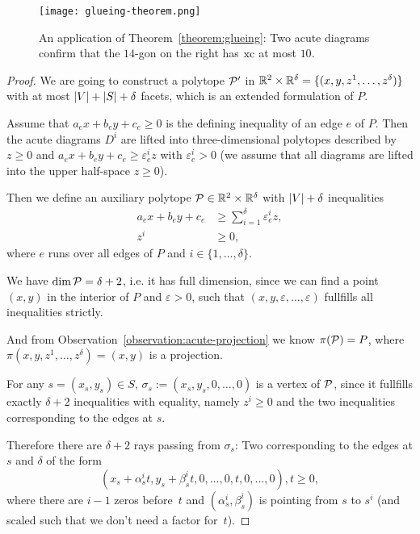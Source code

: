 \begin{figure}[h]
  \centering
  \texttt{[image: glueing-theorem.png]}
  \caption{An application of Theorem~\ref{theorem:glueing}: Two acute diagrams confirm that the $14$-gon on the right has $\xc$ at most $10$. \cite[Figure 3]{shitov2020sublinear}}
  \label{fig:glueing-theorem}
\end{figure}


\begin{proof}
  We are going to construct a polytope $\P'$ in $\R^2 \times \R^{\delta} = \{(x,y,z^1,\dots,z^{\delta})\}$ with at most $\abs{V}+\abs{S}+\delta$ facets, which is an extended formulation of $P$.

  Assume that $a_e x + b_e y + c_e \geq 0$ is the defining inequality of an edge $e$ of $P$. Then the acute diagrams $D^i$ are lifted into three-dimensional polytopes described by $z \geq 0$ and $a_e x + b_e y + c_e \geq \varepsilon_e^i z$ with $\varepsilon_e^i > 0$ (we assume that all diagrams are lifted into the upper half-space $z \geq 0$).

  Then we define an auxiliary polytope $\P \in \R^2 \times \R^{\delta}$ with $\abs{V}+\delta$ inequalities 
  \begin{align*}
    a_e x + b_e y + c_e &\geq \sum_{i=1}^{\delta} \varepsilon_e^i z,\\
    z^i &\geq 0,
  \end{align*}
  where $e$ runs over all edges of $P$ and $i \in \{1,\dots,\delta\}$.

  We have $\dim \P = \delta + 2$, i.e. it has full dimension, since we can find a point $(x,y)$ in the interior of $P$ and $\varepsilon > 0$, such that $(x,y,\varepsilon,\dots,\varepsilon)$ fullfills all inequalities strictly.

  And from Observation~\ref{observation:acute-projection} we know $\pi(\P)=P$, where $\pi(x,y,z^1,\dots,z^{\delta}) = (x,y)$ is a projection.

  For any $s = (x_s, y_s) \in S$, $\sigma_s := (x_s,y_s,0,\dots,0)$ is a vertex of $\P$, since it fullfills exactly $\delta + 2$ inequalities with equality, namely $z^i \geq 0$ and the two inequalities corresponding to the edges at $s$.

  Therefore there are $\delta + 2$ rays passing from $\sigma_s$: Two corresponding to the edges at $s$ and $\delta$ of the form
  \begin{equation}\label{eq:ray}
    (x_s + \alpha_s^i t,y_s + \beta_s^i t,0,\dots,0,t,0,\dots,0), t \geq 0,
  \end{equation}
  where there are $i-1$ zeros before~$t$ and $(\alpha_s^i, \beta_s^i)$ is pointing from $s$ to $s^i$ (and scaled such that we don't need a factor for~$t$).


\end{proof}
